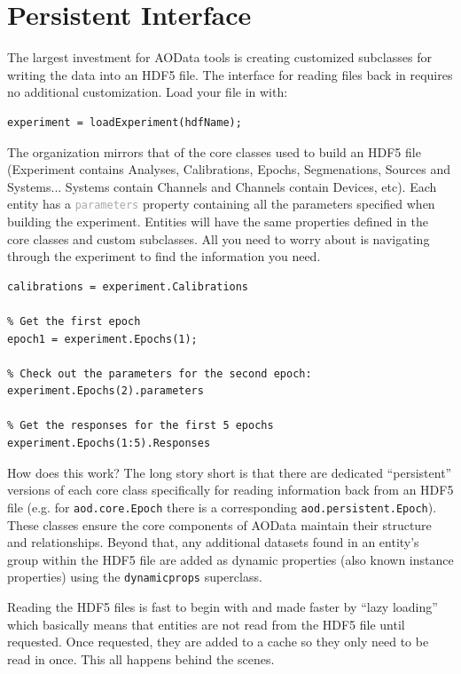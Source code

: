 \documentclass[10pt]{exam}
\newcommand\aodclass[1]{\textcolor{codeblue}{\texttt{#1}}}
\newcommand\matclass[1]{\textcolor{codeblue}{\texttt{#1}}}
\newcommand\aodprop[1]{\textcolor{darkgray}{\texttt{#1}}}
\begin{document}
\section{Persistent Interface}
	\label{section:PersistentInterface}
	\noindent The largest investment for AOData tools is creating customized subclasses for writing the data into an HDF5 file. The interface for reading files back in requires no additional customization. Load your file in with:
	\begin{lstlisting}[style=matlab-editor, basicstyle=\mlttfamily\footnotesize]
experiment = loadExperiment(hdfName);
	\end{lstlisting}
	The organization mirrors that of the core classes used to build an HDF5 file (Experiment contains Analyses, Calibrations, Epochs, Segmenations, Sources and Systems... Systems contain Channels and Channels contain Devices, etc). Each entity has a \aodprop{parameters} property containing all the parameters specified when building the experiment. Entities will have the same properties defined in the core classes and custom subclasses. All you need to worry about is navigating through the experiment to find the information you need.
	\begin{lstlisting}[style=matlab-editor, basicstyle=\mlttfamily\footnotesize]
% Get all the calibrations
calibrations = experiment.Calibrations

% Get the first epoch
epoch1 = experiment.Epochs(1);

% Check out the parameters for the second epoch:
experiment.Epochs(2).parameters

% Get the responses for the first 5 epochs
experiment.Epochs(1:5).Responses 
	\end{lstlisting}
	How does this work? The long story short is that there are dedicated ``persistent'' versions of each core class specifically for reading information back from an HDF5 file (e.g. for \aodclass{aod.core.Epoch} there is a corresponding \aodclass{aod.persistent.Epoch}). These classes ensure the core components of AOData maintain their structure and relationships. Beyond that, any additional datasets found in an entity's group within the HDF5 file are added as dynamic properties (also known instance properties) using the \matclass{dynamicprops} superclass.   
	
	Reading the HDF5 files is fast to begin with and made faster by ``lazy loading'' which basically means that entities are not read from the HDF5 file until requested. Once requested, they are added to a cache so they only need to be read in once. This all happens behind the scenes.
	
\end{document}
